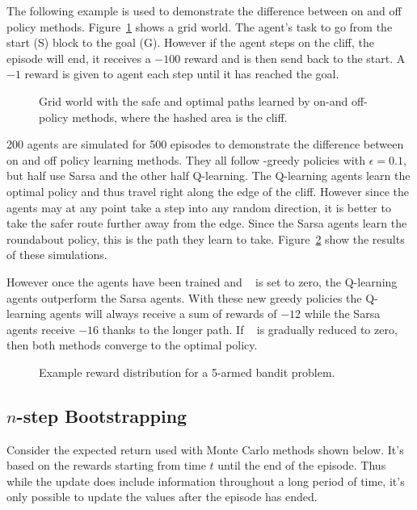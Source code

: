 The following example is used to demonstrate the difference between on and off policy methods. Figure~\ref{fig:on_off_policy} shows a grid world. The agent's task to go from the start (S) block to the goal (G). However if the agent steps on the cliff, the episode will end, it receives a $-100$ reward and is then send back to the start. A $-1$ reward is given to agent each step until it has reached the goal. 

\begin{figure}[ht]			
	\centering
		
	\caption{Grid world with the safe and optimal paths learned by on-and off-policy methods, where the hashed area is the cliff.}
	\label{fig:on_off_policy}
\end{figure}


200 agents are simulated for 500 episodes to demonstrate the difference between on and off policy learning methods. They all follow \eps-greedy policies with $\epsilon=0.1$, but half use Sarsa and the other half Q-learning. The Q-learning agents learn the optimal policy and thus travel right along the edge of the cliff. However since the agents may at any point take a step into any random direction, it is better to take the safer route further away from the edge. Since the Sarsa agents learn the roundabout policy, this is the path they learn to take. Figure~\ref{fig:on_off_policy_results} show the results of these simulations.

However once the agents have been trained and \eps~ is set to zero, the Q-learning agents outperform the Sarsa agents. With these new greedy policies the Q-learning agents will always receive a sum of rewards of $-12$ while the Sarsa agents receive $-16$ thanks to the longer path. If \eps~ is gradually reduced to zero, then both methods converge to the optimal policy.

\begin{figure}[ht]			
	\centering
				
	\caption{Example reward distribution for a 5-armed bandit problem.}
	\label{fig:on_off_policy_results}
\end{figure}


\subsection{$n$-step Bootstrapping}
Consider the expected return used with Monte Carlo methods shown below. It's based on the rewards starting from time $t$ until the end of the episode. Thus while the update does include information throughout a long period of time, it's only possible to update the values after the episode has ended. 

